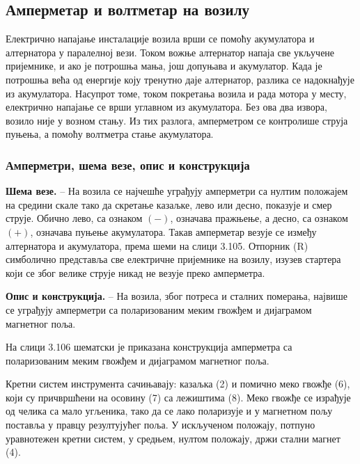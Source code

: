 \documentclass[12pt,a4paper]{report}
\begin{document}
\subsection{Амперметар и волтметар на возилу}

Електрично напајање инсталације возила врши се помоћу акумулатора и алтернатора у паралелној вези. Током вожње алтернатор напаја све укључене пријемнике, и ако је потрошња мања, још допуњава и акумулатор. Када је потрошња већа од енергије коју тренутно даје алтернатор, разлика се надокнађује из акумулатора. Насупрот томе, током покретања возила и рада мотора у месту, електрично напајање се врши углавном из акумулатора. Без ова два извора, возило није у возном стању. Из тих разлога, амперметром се контролише струја пуњења, а помоћу волтметра стање акумулатора.

\subsubsection{Амперметри, шема везе, опис и конструкција}

\textbf{Шема везе.} – На возила се најчешће уграђују амперметри са нултим положајем на средини скале тако да скретање казаљке, лево или десно, показује и смер струје. Обично лево, са ознаком $(-)$, означава пражњење, а десно, са ознаком $(+)$, означава пуњење акумулатора. Такав амперметар везује се између алтернатора и акумулатора, према шеми на слици 3.105. Отпорник (R) симболично представља све електричне пријемнике на возилу, изузев стартера који се због велике струје никад не везује преко амперметра.


\textbf{Опис и конструкција.} – На возила, због потреса и сталних померања, највише се уграђују амперметри са поларизованим меким гвожђем и дијаграмом магнетног поља.

На слици 3.106 шематски је приказана конструкција амперметра са поларизованим меким гвожђем и дијаграмом магнетног поља.

Кретни систем инструмента сачињавају: казаљка (2) и помично меко гвожђе (6), који су причвршћени на осовину (7) са лежиштима (8). Меко гвожђе се израђује од челика са мало угљеника, тако да се лако поларизује и у магнетном пољу поставља у правцу резултујућег поља. У искљученом положају, потпуно уравнотежен кретни систем, у средњем, нултом положају, држи стални магнет (4).
\end{document}
